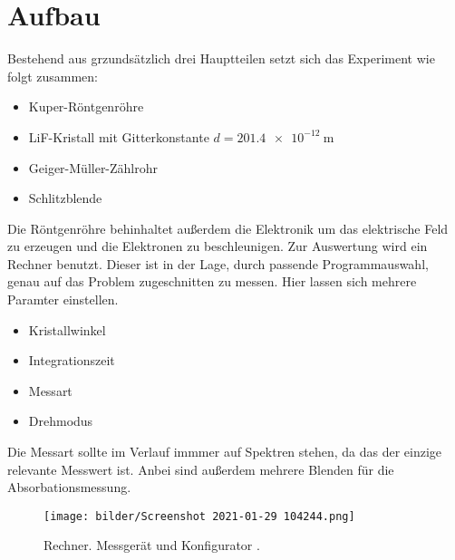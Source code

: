 \section{Aufbau}
Bestehend aus grzundsätzlich drei Hauptteilen setzt sich das Experiment wie folgt zusammen:
\begin{itemize}
    \item{Kuper-Röntgenröhre}
     \item{LiF-Kristall mit Gitterkonstante $d = \SI{201.4e-12}{\meter}$}
     \item{Geiger-Müller-Zählrohr}
     \item{Schlitzblende}
\end{itemize}
Die Röntgenröhre behinhaltet außerdem die Elektronik um das elektrische Feld zu erzeugen und die Elektronen zu beschleunigen.
Zur Auswertung wird ein Rechner benutzt. Dieser ist in der Lage, durch passende Programmauswahl, genau auf das Problem zugeschnitten zu messen. 
Hier lassen sich mehrere Paramter einstellen. 
\begin{itemize}
     \item{Kristallwinkel}
     \item{Integrationszeit}
     \item{Messart}
     \item{Drehmodus}
\end{itemize}
Die Messart sollte im Verlauf immmer auf Spektren stehen, da das der einzige relevante Messwert ist. Anbei sind außerdem mehrere Blenden für die Absorbationsmessung.

\begin{figure}
    \centering
    \texttt{[image: bilder/Screenshot 2021-01-29 104244.png]}
    \caption{Rechner. Messgerät und Konfigurator \cite{skript}. } 
    \label{fig:Rechner}
\end{figure}